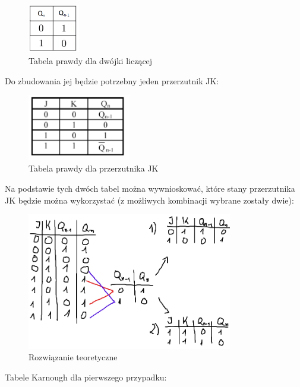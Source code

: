 \documentclass{article}
\begin{document}
\begin{figure}[H]
    \centering
    \includegraphics[width=0.2\textwidth]{3a_tabela_prawdy.png}
    \caption{Tabela prawdy dla dwójki liczącej}
\end{figure}

Do zbudowania jej będzie potrzebny jeden przerzutnik JK:

\begin{figure}[H]
    \centering
    \includegraphics[width=0.4\textwidth]{3a_prawda_o_JK.png}
    \caption{Tabela prawdy dla przerzutnika JK}
\end{figure}

Na podstawie tych dwóch tabel można wywnioskować, które stany przerzutnika JK będzie można wykorzystać (z możliwych kombinacji wybrane
zostały dwie):

\begin{figure}[H]
    \centering
    \includegraphics[width=0.8\textwidth]{3a_teor1.jpg}
    \caption{Rozwiązanie teoretyczne}
\end{figure}

\pagebreak
Tabele Karnough dla pierwszego przypadku:
\end{document}
